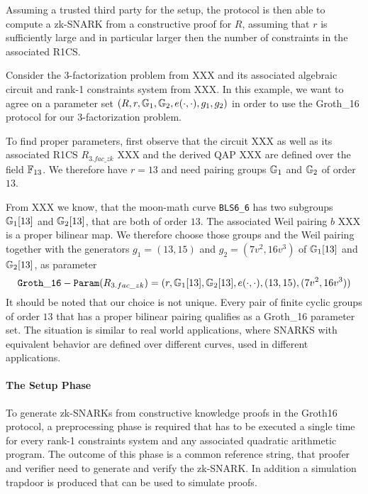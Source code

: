 Assuming a trusted third party for the setup, the protocol is then able to compute a zk-SNARK from a constructive proof for $R$, assuming that $r$ is sufficiently large and in particular larger then the number of constraints in the associated R1CS.
\begin{example} Consider the $3$-factorization problem from XXX and its associated algebraic circuit and rank-1 constraints system from  XXX. In this example, we want to agree on a parameter set $(R,r, \mathbb{G}_1, \mathbb{G}_2, e(\cdot,\cdot), g_1,g_2)$ in order to use the Groth\_16 protocol for our $3$-factorization problem. 

To find proper parameters, first observe that the circuit XXX as well as its associated R1CS $R_{3.fac\_zk}$ XXX and the derived QAP XXX are defined over the field $\mathbb{F}_{13}$. We therefore have $r=13$ and need pairing groups $\mathbb{G}_1$ and $\mathbb{G}_2$ of order $13$. 

From XXX we know, that the moon-math curve \texttt{BLS6\_6} has two subgroups $\mathbb{G}_1[13]$ and $\mathbb{G}_2[13]$, that are both of order $13$. The associated Weil pairing $b$ XXX is a proper bilinear map. We therefore choose those groups and the Weil pairing together with the generators $g_1 = (13,15) $ and $g_2=(7v^2,16v^3)$ of $\mathbb{G}_1[13]$ and $\mathbb{G}_2[13]$, as parameter
$$
\mathtt{Groth\_16-Param}(R_{3.fac\_zk})=(r, \mathbb{G}_1[13], \mathbb{G}_2[13], e(\cdot,\cdot), (13,15),(7v^2,16v^3))
$$
It should be noted that our choice is not unique. Every pair of finite cyclic groups of order $13$ that has a proper bilinear pairing qualifies as a Groth\_16 parameter set. The situation is similar to real world applications, where SNARKS with equivalent behavior are defined over different curves, used in different applications.
\end{example}
\paragraph{The Setup Phase} To generate zk-SNARKs from constructive knowledge proofs in the Groth16 protocol, a preprocessing phase is required that has to be executed a single time for every rank-1 constraints system and any associated quadratic arithmetic program. The outcome of this phase is a common reference string, that proofer and verifier need to generate and verify the zk-SNARK. In addition a simulation trapdoor is produced that can be used to simulate proofs.

